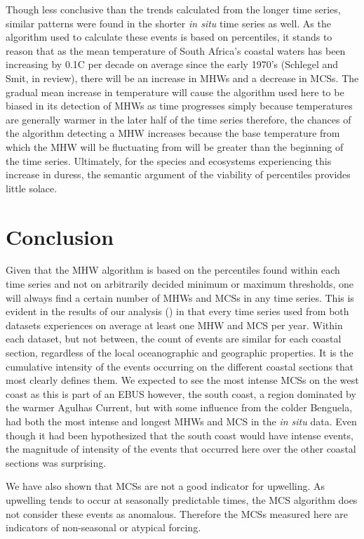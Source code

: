 \documentclass[a4paper,10pt,review]{elsarticle}
\begin{document}
Though less conclusive than the trends calculated from the longer time series, similar patterns were found in the shorter \emph{in situ} time series as well. As the algorithm used to calculate these events is based on percentiles, it stands to reason that as the mean temperature of South Africa's coastal waters has been increasing by 0.1\degree C per decade on average since the early 1970's (Schlegel and Smit, in review), there will be an increase in MHWs and a decrease in MCSs. The gradual mean increase in temperature will cause the algorithm used here to be biased in its detection of MHWs as time progresses simply because temperatures are generally warmer in the later half of the time series therefore, the chances of the algorithm detecting a MHW increases because the base temperature from which the MHW will be fluctuating from will be greater than the beginning of the time series. Ultimately, for the species and ecosystems experiencing this increase in duress, the semantic argument of the viability of percentiles provides little solace. 

\section{Conclusion}
Given that the MHW algorithm is based on the percentiles found within each time series and not on arbitrarily decided minimum or maximum thresholds, one will always find a certain number of MHWs and MCSs in any time series. This is evident in the results of our analysis () in that every time series used from both datasets experiences on average at least one MHW and MCS per year. Within each dataset, but not between, the count of events are similar for each coastal section, regardless of the local oceanographic and geographic properties. It is the cumulative intensity of the events occurring on the different coastal sections that most clearly defines them. We expected to see the most intense MCSs on the west coast as this is part of an EBUS however, the south coast, a region dominated by the warmer Agulhas Current, but with some influence from the colder Benguela, had both the most intense and longest MHWs and MCS in the \emph{in situ} data. Even though it had been hypothesized that the south coast would have intense events, the magnitude of intensity of the events that occurred here over the other coastal sections was surprising.

We have also shown that MCSs are not a good indicator for upwelling. As upwelling tends to occur at seasonally predictable times, the MCS algorithm does not consider these events as anomalous. Therefore the MCSs measured here are indicators of non-seasonal or atypical forcing.
\end{document}
